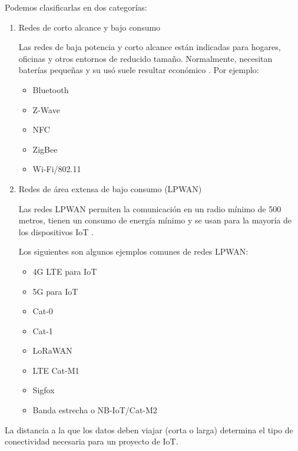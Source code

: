 Podemos clasificarlas en dos categorías:
\begin{enumerate}
\item Redes de corto alcance y bajo consumo 

Las redes de baja potencia y corto alcance están indicadas para hogares, oficinas y otros entornos de reducido tamaño. Normalmente, necesitan baterías pequeñas y su usó suele resultar económico \citep{WEBSITE:15}. Por ejemplo:

\begin{itemize}
\item Bluetooth
\item Z-Wave
\item NFC
\item ZigBee
\item Wi-Fi/802.11
\end{itemize}


\item Redes de área extensa de bajo consumo (LPWAN)

Las redes LPWAN permiten la comunicación en un radio mínimo de 500 metros, tienen un consumo de energía mínimo y se usan para la mayoría de los dispositivos IoT \citep{WEBSITE:15}. 

Los siguientes son algunos ejemplos comunes de redes LPWAN:

\begin{itemize}
\item 4G LTE para IoT
\item 5G para IoT
\item Cat-0
\item Cat-1
\item LoRaWAN
\item LTE Cat-M1
\item Sigfox
\item Banda estrecha o NB-IoT/Cat-M2
\end{itemize}

\end{enumerate}

\vspace{0.5cm}

La distancia a la que los datos deben viajar (corta o larga) determina el tipo de conectividad necesaria para un proyecto de IoT.

\let\cleardoublepage\clearpage %